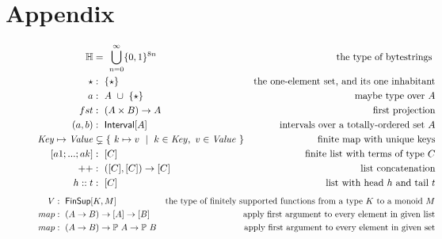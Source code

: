 \section{Appendix}
%

\begin{figure}[htb]
  \begin{align*}
    \H{}
    & =~\bigcup_{n=0}^{\infty}\{0,1\}^{8n}
    & \mbox{the type of bytestrings }
    \\
    \emptytype
    & :~\{\emptytype \}
    & \text{the one-element set, and its one inhabitant}
    \\
    a
    &  :~A~ \cup ~\emptytypeT
    & \text{maybe type over $A$}
    \\
    \fun{fst}
    & :~(A \times B) \to A
    & \text{first projection}
    \\
    (a, b)
    & :~\Interval{A}
    & \text{intervals over a totally-ordered set $A$}
    \\
    \var{Key} \mapsto \var{Value}
    & \subsetneq \{~ k \mapsto v ~\mid~ k \in \var{Key},~v \in \var{Value}~ \}
    & \text{finite map with unique keys}
    \\
    [a1 ; ...; ak]
    & :~[C]
    & \text{finite list with terms of type $C$}
    \\
    ++
    & :~([C], [C]) \to [C]
    & \text{list concatenation}
    \\
    h :: t
    & :~[C]
    & \text{list with head $h$ and tail $t$}
  \end{align*}
  \begin{align*}
    V
    & :~\FinSup{K}{M}
    & \mbox{the type of finitely supported functions from a type $K$ to a monoid $M$}
    \\
    \fun{map}
    & :~(A \to B) \to [A] \to [B]
    & \text{apply first argument to every element in given list}
    \\
    \fun{map}
    & :~(A \to B) \to \powerset{A} \to \powerset{B}
    & \text{apply first argument to every element in given set}

\end{align*}
\end{figure}
